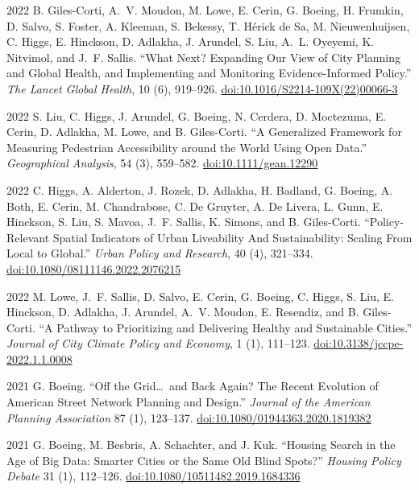 \documentclass[11pt,letterpaper]{report}
\begin{document}
\begin{tablist}
        \item[2022] \tab{}B. Giles-Corti, A.~V. Moudon, M. Lowe, E. Cerin, G. Boeing, H. Frumkin, D. Salvo, S. Foster, A. Kleeman, S. Bekessy, T. Hérick de Sa, M. Nieuwenhuijsen, C. Higgs, E. Hinckson, D. Adlakha, J. Arundel, S. Liu, A.~L. Oyeyemi, K. Nitvimol, and J.~F. Sallis. \enquote{What Next? Expanding Our View of City Planning and Global Health, and Implementing and Monitoring Evidence-Informed Policy.}  \textit{The Lancet Global Health}, 10 (6), 919--926. \href{https://doi.org/10.1016/S2214-109X(22)00066-3}{doi:10.1016/S2214-109X(22)00066-3}

        \item[2022] \tab{}S. Liu, C. Higgs, J. Arundel, G. Boeing, N. Cerdera, D. Moctezuma, E. Cerin, D. Adlakha, M. Lowe, and B. Giles-Corti. \enquote{A Generalized Framework for Measuring Pedestrian Accessibility around the World Using Open Data.} \textit{Geographical Analysis}, 54 (3), 559--582. \href{https://doi.org/10.1111/gean.12290}{doi:10.1111/gean.12290}

        \item[2022] \tab{}C. Higgs, A. Alderton, J. Rozek, D. Adlakha, H. Badland, G. Boeing, A. Both, E. Cerin, M. Chandrabose, C. De Gruyter, A. De Livera, L. Gunn, E. Hinckson, S. Liu, S. Mavoa, J.~F. Sallis, K. Simons, and B. Giles-Corti. \enquote{Policy-Relevant Spatial Indicators of Urban Liveability And Sustainability: Scaling From Local to Global.} \textit{Urban Policy and Research}, 40 (4), 321--334. \href{https://doi.org/10.1080/08111146.2022.2076215}{doi:10.1080/08111146.2022.2076215}

        \item[2022] \tab{}M. Lowe, J.~F. Sallis, D. Salvo, E. Cerin, G. Boeing, C. Higgs, S. Liu, E. Hinckson, D. Adlakha, J. Arundel, A.~V. Moudon, E. Resendiz, and B. Giles-Corti. \enquote{A Pathway to Prioritizing and Delivering Healthy and Sustainable Cities.} \textit{Journal of City Climate Policy and Economy}, 1 (1), 111--123. \href{https://doi.org/10.3138/jccpe-2022.1.1.0008}{doi:10.3138/jccpe-2022.1.1.0008}

        \item[2021] \tab{}G. Boeing. \enquote{Off the Grid\ldots\ and Back Again? The Recent Evolution of American Street Network Planning and Design.} \textit{Journal of the American Planning Association} 87 (1), 123--137. \href{https://doi.org/10.1080/01944363.2020.1819382}{doi:10.1080/01944363.2020.1819382}

        \item[2021] \tab{}G. Boeing, M. Besbris, A. Schachter, and J. Kuk. \enquote{Housing Search in the Age of Big Data: Smarter Cities or the Same Old Blind Spots?} \textit{Housing Policy Debate} 31 (1), 112--126. \href{https://doi.org/10.1080/10511482.2019.1684336}{doi:10.1080/10511482.2019.1684336}


\end{tablist}
\end{document}

